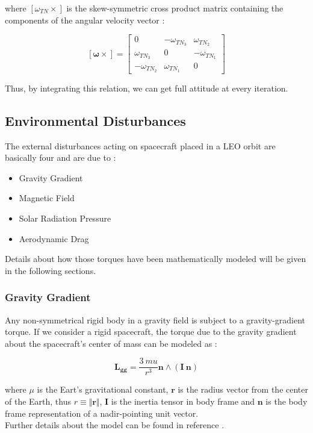where $[\omega_{TN} \times]$ is the skew-symmetric cross product matrix containing the components of the angular velocity vector :

\begin{equation*}
  \mathbf{[\omega \times]} =
  \begin{bmatrix}
    0                & -\omega_{TN_{3}} & \omega_{TN_{2}}  \\
    \omega_{TN_{3}}  & 0                & -\omega_{TN_{1}} \\
    -\omega_{TN_{2}} & \omega_{TN_{1}}  & 0
  \end{bmatrix}
\end{equation*}

Thus, by integrating this relation, we can get full attitude at every iteration.

\subsection{Environmental Disturbances} \label{sec:disturbances}
The external disturbances acting on spacecraft placed in a LEO orbit are basically four and are due to :

\begin{itemize}
  \item Gravity Gradient
  \item Magnetic Field
  \item Solar Radiation Pressure
  \item Aerodynamic Drag
\end{itemize}

Details about how those torques have been mathematically modeled will be given in the following sections.

\subsubsection{Gravity Gradient}
Any non-symmetrical rigid body in a gravity field is subject to a gravity-gradient torque.
If we consider a rigid spacecraft, the torque due to the gravity gradient about the spacecraft's center of mass can be modeled as :

\begin{equation}
  \mathbf{L_{gg}} = \frac{3 \ mu}{r^3} \mathbf{n} \wedge (\mathbf{I} \ \mathbf{n})
\end{equation}

where $\mu$ is the Eart's gravitational constant, $\textbf{r}$ is the radius vector from the center of the Earth, thus $r \equiv \Vert{\textbf{r}}\Vert$, $\textbf{I}$ is the inertia tensor in body frame and $\textbf{n}$ is the body frame representation of a nadir-pointing unit vector.\\
Further details about the model can be found in reference \cite{Markley2014}.

